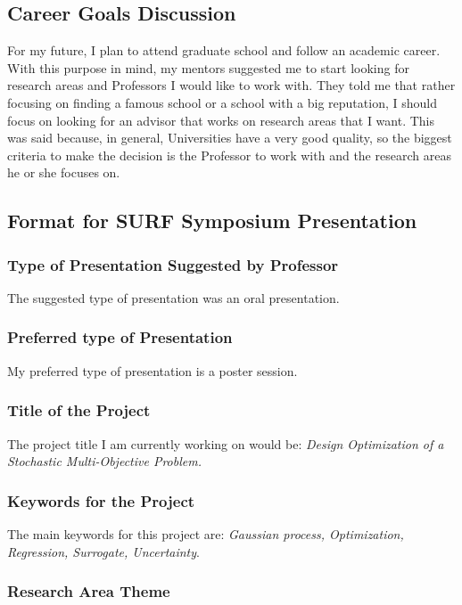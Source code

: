 \documentclass[a4paper]{journal}
\begin{document}
\subsection{Career Goals Discussion}

For my future, I plan to attend graduate school and follow an academic career. With this purpose in mind, my mentors suggested me to start looking for research areas and Professors I would like to work with. They told me that rather focusing on finding a famous school or a school with a big reputation, I should focus on looking for an advisor that works on research areas that I want. This was said because, in general, Universities have a very good quality, so the biggest criteria to make the decision is the Professor to work with and the research areas he or she focuses on.

\subsection{Format for SURF Symposium Presentation}
\subsubsection{Type of Presentation Suggested by Professor}

The suggested type of presentation was an oral presentation.

\subsubsection{Preferred type of Presentation}

My preferred type of presentation is a poster session.

\subsubsection{Title of the Project}

The project title I am currently working on would be: \textit{Design Optimization of a Stochastic Multi-Objective Problem.}

\subsubsection{Keywords for the Project}

The main keywords for this project are: \textit{Gaussian process, Optimization, Regression, Surrogate, Uncertainty}.

\subsubsection{Research Area Theme}
\end{document}
